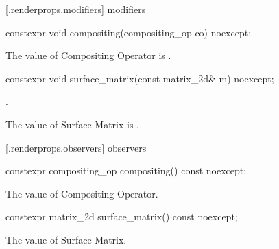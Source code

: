  [\iotwod.renderprops.modifiers] { modifiers}

\begin{itemdecl}
constexpr void compositing(compositing_op co) noexcept;
\end{itemdecl}
\begin{itemdescr}
\pnum
\effects
The value of Compositing Operator is .
\end{itemdescr}

\begin{itemdecl}
constexpr void surface_matrix(const matrix_2d& m) noexcept;
\end{itemdecl}
\begin{itemdescr}
\pnum
\requires
{}.

\pnum
\effects
The value of Surface Matrix is .
\end{itemdescr}

 [\iotwod.renderprops.observers] { observers}

\begin{itemdecl}
constexpr compositing_op compositing() const noexcept;
\end{itemdecl}
\begin{itemdescr}
\pnum
\returns
The value of Compositing Operator.
\end{itemdescr}

\begin{itemdecl}
constexpr matrix_2d surface_matrix() const noexcept;
\end{itemdecl}
\begin{itemdescr}
\pnum
\returns
The value of Surface Matrix.
\end{itemdescr}

